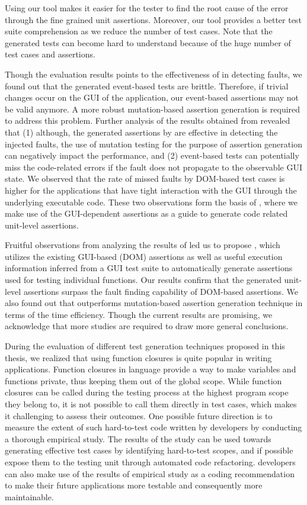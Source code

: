 Using our tool makes it easier for the tester to find the root cause of the error through the fine grained unit assertions. Moreover, our tool provides a better test suite comprehension as we reduce the number of test cases. Note that the generated tests can become hard to understand because of the huge number of test cases and assertions.

Though the evaluation results points to the effectiveness of \jseft in detecting faults, we found out that the generated event-based tests are brittle. Therefore, if trivial changes occur on the GUI of the application, our event-based assertions may not be valid anymore. A more robust mutation-based assertion generation is required to address this problem.
Further analysis of the results obtained from \jseft revealed that (1) although, the generated assertions by \jseft are effective in detecting the injected faults, the use of mutation testing for the purpose of assertion generation can negatively impact the performance, and (2) event-based tests can potentially miss the code-related errors if the fault does not propagate to the observable GUI state. We observed that the rate of missed faults by DOM-based test cases is higher for the applications that have tight interaction with the GUI through the underlying executable code. These two observations form the basis of , where we make use of the GUI-dependent assertions as a guide to generate code related unit-level assertions.

 Fruitful observations from analyzing the results of \jseft led us to propose \atrina, which utilizes the existing GUI-based (\ie DOM) assertions as well as useful execution information inferred from a GUI test suite to automatically generate assertions used for testing individual functions. Our results confirm that the generated unit-level assertions surpass the fault finding capability of DOM-based assertions. We also found out that \atrina outperforms mutation-based assertion generation technique in terms of the time efficiency. Though the current results are promising, we acknowledge that more studies are required to draw more general conclusions.

 During the evaluation of different test generation techniques proposed in this thesis, we realized that using function closures is quite popular in writing \javascript applications. 
Function closures in \javascript language provide a way to make variables and functions private, thus keeping them out of the global scope.
While function closures can be called during the testing process at the highest program scope they belong to, it is not possible to call them directly in test cases, which makes it challenging to assess their outcomes.
One possible future direction is to measure the extent of such hard-to-test code written by developers by conducting a thorough empirical study.
The results of the study can be used towards generating effective test cases by identifying hard-to-test scopes, and if possible expose them to the testing unit through automated code refactoring. \javascript developers can also make use of the results of empirical study as a coding recommendation to make their future applications more testable and consequently more maintainable.

